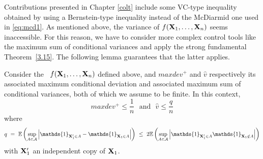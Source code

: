 Contributions presented in Chapter \ref{colt} include some VC-type inequality obtained by using a Bernstein-type inequality instead of the McDiarmid one used in \eqref{eq:mcd1}. As mentioned above, the variance of $f(\mathbf X_1,\ldots,\mathbf X_n)$ seems inaccessible. For this reason, we have to consider more complex control tools like the maximum sum of conditional variances and apply the strong fundamental Theorem~\ref{3.15}. The following lemma guarantees that the latter applies.
\begin{lemma}
\label{back:lem-1}
Consider the \rv~$f(\mathbf X_1,\ldots,\mathbf X_n)$ defined above, and $maxdev^+$ and $\hat v$ respectively its associated maximum conditional deviation and associated maximum sum of conditional variances, both of which we assume to be finite. In this context,
$$maxdev^+ \le \frac{1}{n} \text{~~and~~} \hat v \le \frac{q}{n}$$ where 
\begin{align*}
q ~=~ \mathbb{E}\left ( \sup_{A \in \mathcal{A}} \left | \mathds{1}_{\mb X_1' \in A} - \mathds{1}_{\mb X_1 \in A} \right|\right) ~\le~ 2 \mathbb{E}\left ( \sup_{A \in \mathcal{A}} \left | \mathds{1}_{\mb X_1' \in A}  \mathds{1}_{\mb X_1 \notin A} \right|\right) 
\end{align*}
with $\mathbf X'_1$ an independent copy of $\mathbf X_1$.
\end{lemma}

